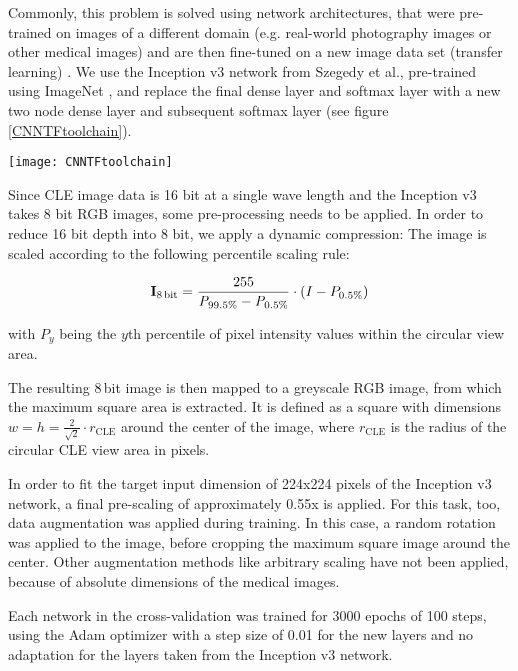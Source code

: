 \documentclass[fleqn,10pt]{wlscirep}
\begin{document}
Commonly, this problem is solved using network architectures, that were pre-trained on images of a different domain (e.g. real-world photography images or other medical images) and are then fine-tuned on a new image data set (transfer learning) \cite{Shin:cx,Esteva:2017ct}. We use the Inception v3 network from Szegedy et al.\cite{Szegedy:2016cv}, pre-trained using ImageNet \cite{imagenet_cvpr09}, and replace the final dense layer and softmax layer with a new two node dense layer and subsequent softmax layer (see figure \ref{CNNTFtoolchain}).  

\begin{figure*}[!t]
\centering
\texttt{[image: CNNTFtoolchain]}
\hfil
\caption{Overview of the transfer learning approach, based on Szegedy's Inception v3 \cite{Szegedy:2016cv}, pre-trained on the ImageNet database \cite{imagenet_cvpr09} }
\label{CNNTFtoolchain}
\end{figure*}

Since CLE image data is 16 bit at a single wave length and the Inception v3 takes 8 bit RGB images, some pre-processing needs to be applied.
In order to reduce 16 bit depth into 8 bit, we apply a dynamic compression: The image is scaled according to the following percentile scaling rule:

$$ \mathbf{I}_\textrm{8\,bit} = \frac{255}{\mathit{P}_{99.5\%} - \mathit{P}_{0.5\%}} \cdot (I-P_{0.5\%})$$

with $\mathit{P}_y$ being the $y$th percentile of pixel intensity values within the circular view area.

The resulting 8\,bit image is then mapped to a greyscale RGB image, from which the maximum square area is extracted. It is defined as a square with dimensions $w=h=\frac{2}{\sqrt{2}} \cdot r_\mathrm{CLE}$ around the
center of the image, where
$r_\mathrm{CLE}$ is the radius of the circular CLE view area in pixels.

In order to fit the target input dimension of 224x224 pixels of the Inception v3 network, a final pre-scaling of approximately 0.55x is applied. For this task, too, data augmentation was applied during training. In this case, a random rotation was applied to the image, before cropping the maximum square image around the center. Other augmentation methods like arbitrary scaling have not been applied, because of absolute dimensions of the medical images. 

Each network in the cross-validation was trained for 3000 epochs of 100 steps, using the Adam optimizer with a step size of 0.01 for the new layers and no adaptation for the layers taken from the Inception v3 network.
\end{document}
